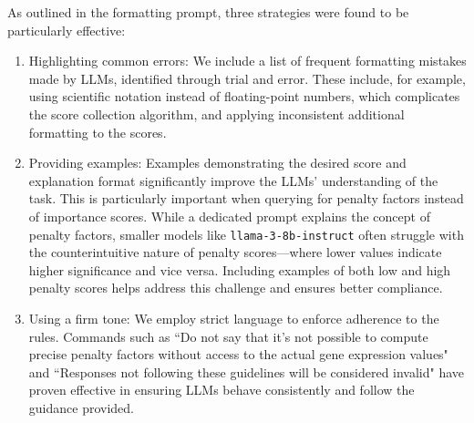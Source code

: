 \noindent{}
\vspace{0.5cm}

As outlined in the formatting prompt, three strategies were found to be particularly effective:
\begin{enumerate}
\item Highlighting common errors: We include a list of frequent formatting mistakes made by LLMs, identified through trial and error. These include, for example, using scientific notation instead of floating-point numbers, which complicates the score collection algorithm, and applying inconsistent additional formatting to the scores.
\item Providing examples: Examples demonstrating the desired score and explanation format significantly improve the LLMs' understanding of the task. This is particularly important when querying for penalty factors instead of importance scores. While a dedicated prompt explains the concept of penalty factors, smaller models like \texttt{llama-3-8b-instruct} often struggle with the counterintuitive nature of penalty scores—where lower values indicate higher significance and vice versa. Including examples of both low and high penalty scores helps address this challenge and ensures better compliance. 
\item Using a firm tone: We employ strict language to enforce adherence to the rules. Commands such as ``Do not say that it’s not possible to compute precise penalty factors without access to the actual gene expression values" and ``Responses not following these guidelines will be considered invalid" have proven effective in ensuring LLMs behave consistently and follow the guidance provided.
\end{enumerate}

